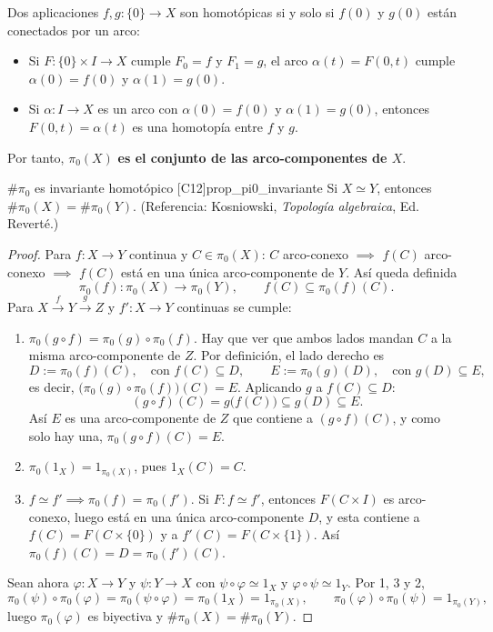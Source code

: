 Dos aplicaciones $f, g \colon \{0\} \to X$ son homotópicas si y solo si $f(0)$ y $g(0)$ están conectados por un arco:
\begin{itemize}
    \item[$\Rightarrow)$] Si $F \colon \{0\} \times I \to X$ cumple $F_0 = f$ y $F_1 = g$, el arco $\alpha(t) = F(0,t)$ cumple $\alpha(0) = f(0)$ y $\alpha(1) = g(0)$.
    \item[$\Leftarrow)$] Si $\alpha \colon I \to X$ es un arco con $\alpha(0) = f(0)$ y $\alpha(1) = g(0)$, entonces $F(0,t) = \alpha(t)$ es una homotopía entre $f$ y $g$.
\end{itemize}
Por tanto, $\pi_0(X)$ \textbf{es el conjunto de las arco-componentes de $X$}.

\begin{proposicion}{$\#\pi_0$ es invariante homotópico [C12]}{prop_pi0_invariante}
Si $X \simeq Y$, entonces $\#\pi_0(X) = \#\pi_0(Y)$. (Referencia: Kosniowski, \emph{Topología algebraica}, Ed. Reverté.)
\end{proposicion}

\begin{proof}
Para $f \colon X \to Y$ continua y $C \in \pi_0(X)$: $C$ arco-conexo $\implies$ $f(C)$ arco-conexo $\implies$ $f(C)$ está en una única arco-componente de $Y$. Así queda definida
\[ \pi_0(f) \colon \pi_0(X) \to \pi_0(Y), \qquad f(C) \subseteq \pi_0(f)(C). \]
Para $X \xrightarrow{f} Y \xrightarrow{g} Z$ y $f' \colon X \to Y$ continuas se cumple:
\begin{enumerate}
    \item $\pi_0(g \circ f) = \pi_0(g) \circ \pi_0(f)$. Hay que ver que ambos lados mandan $C$ a la misma arco-componente de $Z$. Por definición, el lado derecho es
    \[ D := \pi_0(f)(C), \quad\text{con } f(C) \subseteq D, \qquad E := \pi_0(g)(D), \quad\text{con } g(D) \subseteq E, \]
    es decir, $\big(\pi_0(g) \circ \pi_0(f)\big)(C) = E$. Aplicando $g$ a $f(C) \subseteq D$:
    \[ (g \circ f)(C) = g\big(f(C)\big) \subseteq g(D) \subseteq E. \]
    Así $E$ es una arco-componente de $Z$ que contiene a $(g \circ f)(C)$, y como solo hay una, $\pi_0(g \circ f)(C) = E$.
    \item $\pi_0(1_X) = 1_{\pi_0(X)}$, pues $1_X(C) = C$.
    \item $f \simeq f' \implies \pi_0(f) = \pi_0(f')$. Si $F \colon f \simeq f'$, entonces $F(C \times I)$ es arco-conexo, luego está en una única arco-componente $D$, y esta contiene a $f(C) = F(C \times \{0\})$ y a $f'(C) = F(C \times \{1\})$. Así $\pi_0(f)(C) = D = \pi_0(f')(C)$.
\end{enumerate}

Sean ahora $\varphi \colon X \to Y$ y $\psi \colon Y \to X$ con $\psi \circ \varphi \simeq 1_X$ y $\varphi \circ \psi \simeq 1_Y$. Por 1, 3 y 2,
\[ \pi_0(\psi) \circ \pi_0(\varphi) = \pi_0(\psi \circ \varphi) = \pi_0(1_X) = 1_{\pi_0(X)}, \qquad \pi_0(\varphi) \circ \pi_0(\psi) = 1_{\pi_0(Y)}, \]
luego $\pi_0(\varphi)$ es biyectiva y $\#\pi_0(X) = \#\pi_0(Y)$.
\end{proof}
